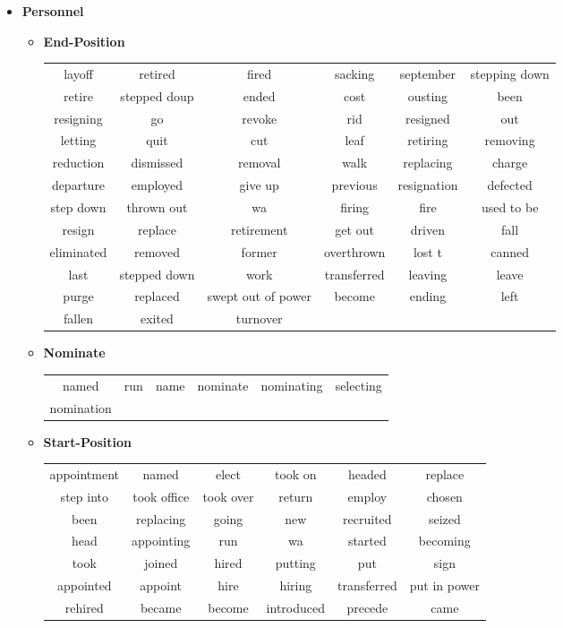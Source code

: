\documentclass[11pt, oneside]{article}   	%
\begin{document}
\begin{itemize}
\clearpage
\item[] \textbf{Personnel} 
	\vspace*{-0.2cm}
	\begin{itemize}
	\item[] \textbf{End-Position} \\
		 \begin{tabular}{ c c c c c c }
		 layoff & retired & fired & sacking & september & stepping
down\\retire & stepped doup & ended & cost & ousting & been\\resigning & go & revoke & rid & resigned & out\\letting & quit & cut & leaf & retiring & removing\\reduction & dismissed & removal & walk & replacing & charge\\departure & employed & give up & previous & resignation & defected\\step down & thrown out & wa & firing & fire & used
to be\\resign & replace & retirement & get out & driven & fall\\eliminated & removed & former & overthrown & lost t & canned\\last & stepped down & work & transferred & leaving & leave\\purge & replaced & swept out of power & become & ending & left\\fallen & exited & turnover
		\end{tabular}
	\item[] \textbf{Nominate} \\
		 \begin{tabular}{ c c c c c c }
		named & run & name & nominate & nominating & selecting\\nomination
		\end{tabular}
	\item[] \textbf{Start-Position} \\
		 \begin{tabular}{ c c c c c c }
		appointment & named & elect & took on & headed & replace\\step into & took office & took over & return & employ & chosen\\been & replacing & going & new & recruited & seized\\head & appointing & run & wa & started & becoming\\took & joined & hired & putting & put & sign\\appointed & appoint & hire & hiring & transferred & put in power\\rehired & became & become & introduced & precede & came

\end{tabular}
\end{itemize}
\end{itemize}
\end{document}
